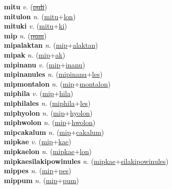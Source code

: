 \textbf{mitu} \textit{v.} (\hyperref[puli]{\sout{puli}})
 \label{mitu} \\
\textbf{mitulon} \textit{n.} (\hyperref[mitu]{mitu}+\hyperref[lon]{lon})
 \label{mitulon} \\
\textbf{mituki} \textit{v.} (\hyperref[mitu]{mitu}+\hyperref[ki]{ki})
 \label{mituki} \\
\textbf{mip} \textit{n.} (\hyperref[pum]{\sout{pum}})
 \label{mip} \\
\textbf{mipalaktan} \textit{n.} (\hyperref[mip]{mip}+\hyperref[alaktan]{alaktan})
 \label{mipalaktan} \\
\textbf{mipak} \textit{n.} (\hyperref[mip]{mip}+\hyperref[ak]{ak})
 \label{mipak} \\
\textbf{mipinanu} \textit{v.} (\hyperref[mip]{mip}+\hyperref[inanu]{inanu})
 \label{mipinanu} \\
\textbf{mipinanules} \textit{n.} (\hyperref[mipinanu]{mipinanu}+\hyperref[les]{les})
 \label{mipinanules} \\
\textbf{mipmontalon} \textit{n.} (\hyperref[mip]{mip}+\hyperref[montalon]{montalon})
 \label{mipmontalon} \\
\textbf{miphila} \textit{v.} (\hyperref[mip]{mip}+\hyperref[hila]{hila})
 \label{miphila} \\
\textbf{miphilales} \textit{n.} (\hyperref[miphila]{miphila}+\hyperref[les]{les})
 \label{miphilales} \\
\textbf{miphyolon} \textit{n.} (\hyperref[mip]{mip}+\hyperref[hyolon]{hyolon})
 \label{miphyolon} \\
\textbf{miphwolon} \textit{n.} (\hyperref[mip]{mip}+\hyperref[hwolon]{hwolon})
 \label{miphwolon} \\
\textbf{mipcakalum} \textit{n.} (\hyperref[mip]{mip}+\hyperref[cakalum]{cakalum})
 \label{mipcakalum} \\
\textbf{mipkae} \textit{v.} (\hyperref[mip]{mip}+\hyperref[kae]{kae})
 \label{mipkae} \\
\textbf{mipkaelon} \textit{n.} (\hyperref[mipkae]{mipkae}+\hyperref[lon]{lon})
 \label{mipkaelon} \\
\textbf{mipkaesilakipowinules} \textit{n.} (\hyperref[mipkae]{mipkae}+\hyperref[silakipowinules]{silakipowinules})
 \label{mipkaesilakipowinules} \\
\textbf{mippes} \textit{n.} (\hyperref[mip]{mip}+\hyperref[pes]{pes})
 \label{mippes} \\
\textbf{mippum} \textit{n.} (\hyperref[mip]{mip}+\hyperref[pum]{pum})
 \label{mippum} \\
